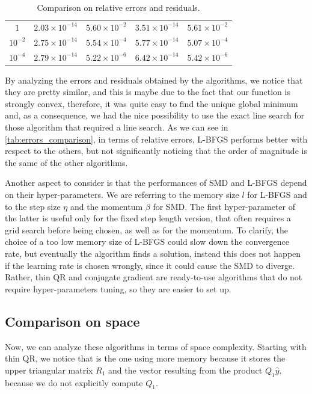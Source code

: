 \begin{table}[H]
\begin{tabular}{c|c|c|c|c}
    \rowcolor{gray!30} $1$ & $2.03\times 10^{-14}$ & $ 5.60 \times 10^{-2}$ & $3.51 \times 10^{-14}$ & $5.61 \times 10^{-2}$ \\
    
    $10^{-2}$ & $2.75 \times 10^{-14} $ & $5.54 \times 10^{-4}$ & $5.77 \times 10^{-14}$ & $5.07 \times 10^{-4}$ \\
    
    \rowcolor{gray!30} $10^{-4}$& $2.79 \times 10^{-14}$ & $5.22 \times 10^{-6}$ & $6.42 \times 10^{-14}$ & $5.42 \times 10^{-6}$\\
    \hline \hline
    
    \end{tabular}
\caption{Comparison on relative errors and residuals.}
\label{tab:errors_comparison}
\end{table}

\noindent By analyzing the errors and residuals obtained by the algorithms, we notice that they are pretty similar, and this is maybe due to the fact that our function is strongly convex, therefore, it was quite easy to find the unique global minimum and, as a consequence, we had the nice possibility to use the exact line search for those algorithm that required a line search. As we can see in \autoref{tab:errors_comparison}, in terms of relative errors, L-BFGS performs better with respect to the others, but not significantly noticing that the order of magnitude is the same of the other algorithms.
\vspace{3mm}

\noindent Another aspect to consider is that the performances of SMD and L-BFGS depend on their hyper-parameters. We are referring to the memory size $l$ for L-BFGS and to the step size $\eta$ and the momentum $\beta$ for SMD. The first hyper-parameter of the latter is useful only for the fixed step length version, that often requires a grid search before being chosen, as well as for the momentum. To clarify, the choice of a too low memory size of L-BFGS could slow down the convergence rate, but eventually the algorithm finds a solution, instead this does not happen if the learning rate is chosen wrongly, since it could cause the SMD to diverge. Rather, thin QR and conjugate gradient are ready-to-use algorithms that do not require hyper-parameters tuning, so they are easier to set up.

\subsection{Comparison on space}
Now, we can analyze these algorithms in terms of space complexity. Starting with thin QR, we notice that is the one using more memory because it stores the upper triangular matrix $R_1$ and the vector resulting from the product $Q_1 \hat{y}$, because we do not explicitly compute $Q_1$.
\vspace{3mm}

